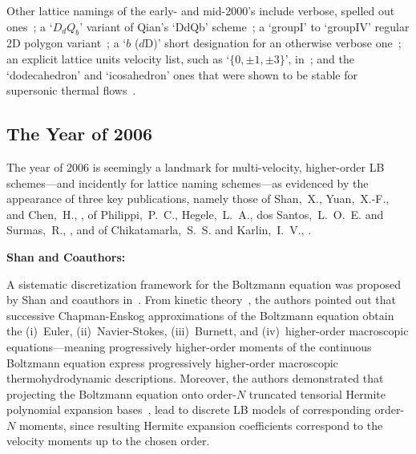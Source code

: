     Other     lattice     namings     of     the     early-     and     mid-2000's     include     verbose,     spelled      out
    ones~\cite{2001-dHumieresD+LallemandP-PhysRevE,   2005-LuXY-IntJModPhysC};   a   `$D_dQ_b$'   variant   of   Qian's   `DdQb'
    scheme~\cite{2003-NourgalievRR+JosephD-IntJMulFlow};     a     `groupI'     to     `groupIV'     regular     2D      polygon
    variant~\cite{2003-WatariM+TsutaharaM-PhysRevE, 2007-WatariM-PhysA}; a `$b$  ($d$D)'  short  designation  for  an  otherwise
    verbose one~\cite{2006-ChikatamarlaSS+KarlinIV-PhysRevLett}; an explicit lattice units velocity list, such as `$\{0, \pm  1,
    \pm 3\}$', in~\cite{2006-ChikatamarlaSS+KarlinIV-PhysRevLett}; and the `dodecahedron' and `icosahedron' ones that were shown
    to be stable for supersonic thermal flows~\cite{2006-WatariM+TsutaharaM-PhysA, 2007-WatariM-PhysA}.

    \subsection{The Year of 2006}

    The year of 2006 is seemingly a landmark for multi-velocity, higher-order LB schemes---and  incidently  for  lattice  naming
    schemes---as evidenced by the appearance of three key publications, namely those of  Shan,~X.,  Yuan,~X.-F.,  and  Chen,~H.,
    \cite{2006-ShanX+ChenH-JFluidMech},   of   Philippi,~P.~C.,   Hegele,~L.~A.,   dos    Santos,~L.~O.~E.    and    Surmas,~R.,
    \cite{2006-PhilippiPC+SurmasR-PhysRevE},        and        of         Chikatamarla,~S.~S.         and         Karlin,~I.~V.,
    \cite{2006-ChikatamarlaSS+KarlinIV-PhysRevLett}.


    \vspace{2.0mm}\noindent\textbf{Shan and Coauthors:}\vspace{1.0mm}

    A  sistematic   discretization   framework   for   the   Boltzmann   equation   was   proposed   by   Shan   and   coauthors
    in~\cite{2006-ShanX+ChenH-JFluidMech}.  From  kinetic  theory~\cite{2011-HarrisS-Dover,   2003-LiboffRL-bookSpringer},   the
    authors pointed out  that  successive  Chapman-Enskog  approximations  of  the  Boltzmann  equation  obtain  the  (i)~Euler,
    (ii)~Navier-Stokes, (iii)~Burnett, and (iv)~high\-er-or\-der macroscopic equations---meaning progressively  high\-er-or\-der
    moments  of  the  continuous  Boltzmann  equation  express  progressively  high\-er-or\-der  macroscopic  thermohydrodynamic
    descriptions. Moreover, the authors demonstrated that projecting the Boltzmann equation onto order-$N$  truncated  tensorial
    Hermite polynomial expansion bases~\cite{1949-GradH-CommPureApplMath}, lead  to  discrete  LB  models  of  corres\-pon\-ding
    order-$N$ moments, since resulting Hermite expansion coefficients correspond to the velocity moments up to the chosen order.

